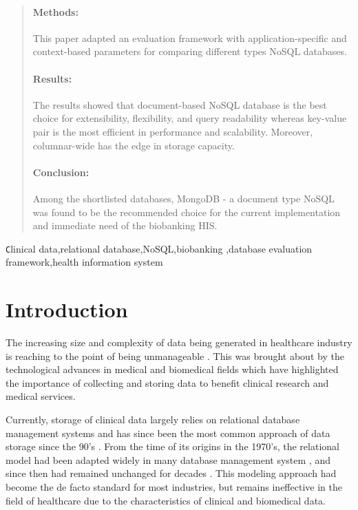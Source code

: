 \documentclass[5p]{elsarticle}
\begin{document}
\begin{frontmatter}
\begin{abstract}
\paragraph{Methods:} This paper adapted an evaluation framework with application-specific and context-based parameters for comparing 
different types NoSQL databases.

\paragraph{Results:} The results showed that document-based NoSQL database is the best choice for extensibility, flexibility, and query 
readability whereas key-value pair is the most efficient in performance and scalability. Moreover, columnar-wide has the edge in 
storage capacity. 

\paragraph{Conclusion:} Among the shortlisted databases, MongoDB - a document type NoSQL was found to be the recommended choice for the current implementation 
and immediate need of the biobanking HIS.

\end{abstract}

\begin{keyword}
\texttt Clinical data\sep relational database\sep NoSQL\sep biobanking
\sep database evaluation framework\sep health information system
\end{keyword}

\end{frontmatter}

\linenumbers

\section{Introduction}
The increasing size and complexity of data being generated in healthcare industry is reaching
 to the point of being unmanageable \cite{R.Kumar2015208,M.Ercan190510}. This was brought about 
 by the technological advances in medical and biomedical fields which have highlighted the importance 
 of collecting and storing data to benefit clinical research and medical services.

Currently, storage of clinical data largely relies on relational database management systems 
\cite{Z.Goli-Malekabadi201675,K.Lee201299} and has since been the most common approach of data 
storage since the 90’s \cite{P.Atzeni1993}. From the time of its origins in the 1970’s, the relational 
model had been adapted widely in many database management system \cite{K.Berg201329,D.Suciu200139}, and 
since then had remained unchanged for decades \cite{M.Ercan190510}. This modeling approach had become the de 
facto standard for most industries, but remains ineffective in the field of healthcare due to the characteristics
 of clinical and biomedical data.
\end{document}
